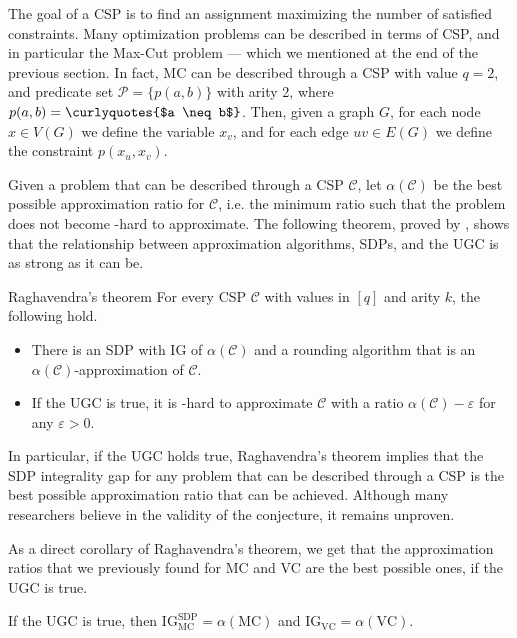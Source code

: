 \documentclass[a4paper, 12pt]{report}
\begin{document}
    The goal of a CSP is to find an assignment maximizing the number of satisfied constraints. Many optimization problems can be described in terms of CSP, and in particular the Max-Cut problem --- which we mentioned at the end of the previous section. In fact, MC can be described through a CSP with value $q = 2$, and predicate set $\mathcal P = \{p(a, b)\}$ with arity 2, where $p(a, b) = \mbox{\curlyquotes{$a \neq b$}}$. Then, given a graph $G$, for each node $x \in V(G)$ we define the variable $x_v$, and for each edge $uv \in E(G)$ we define the constraint $p(x_u, x_v)$.
    
    Given a problem that can be described through a CSP $\mathcal C$, let $\alpha(\mathcal C)$ be the best possible approximation ratio for $\mathcal C$, i.e. the minimum ratio such that the problem does not become \NPclass-hard to approximate. The following theorem, proved by \textcite{raghavendra}, shows that the relationship between approximation algorithms, SDPs, and the UGC is as strong as it can be.

    \begin{framedthm}{Raghavendra's theorem}
        For every CSP $\mathcal C$ with values in $[q]$ and arity $k$, the following hold.

        \begin{itemize}
            \item There is an SDP with IG of $\alpha(\mathcal C)$ and a rounding algorithm that is an $\alpha(\mathcal C)$-approximation of $\mathcal C$.
            \item If the UGC is true, it is \NPclass-hard to approximate $\mathcal C$ with a ratio $\alpha(\mathcal C) - \varepsilon$ for any $\varepsilon > 0$.
        \end{itemize}
    \end{framedthm}

    In particular, if the UGC holds true, Raghavendra's theorem implies that the SDP integrality gap for any problem that can be described through a CSP is the best possible approximation ratio that can be achieved. Although many researchers believe in the validity of the conjecture, it remains unproven.

    As a direct corollary of Raghavendra's theorem, we get that the approximation ratios that we previously found for MC and VC are the best possible ones, if the UGC is true.

    \begin{framedcor}{}
        If the UGC is true, then $\mathrm{IG}_{\mathrm{MC}}^{\mathrm{SDP}} = \alpha(\mathrm{MC})$ and $\mathrm{IG}_\mathrm{VC} = \alpha(\mathrm{VC})$.
    \end{framedcor}
\end{document}
